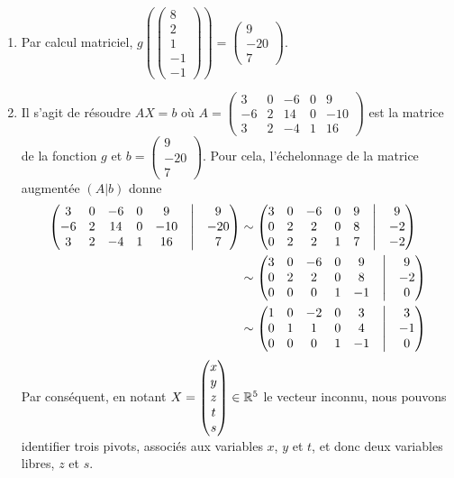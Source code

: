 {\begin{enumerate}
		\item
		Par calcul matriciel, $g(\begin{pmatrix} 8 \\ 2 \\ 1 \\ -1 \\ -1 \end{pmatrix}) = \begin{pmatrix} 9 \\ -20 \\ 7 \end{pmatrix}$.
		\item
		Il s'agit de résoudre $AX = b$ où $A = \begin{pmatrix}3&0&-6&0&9\\-6&2&14&0&-10\\3&2&-4&1&16\end{pmatrix}$ est la matrice de la fonction $g$ et $b =  \begin{pmatrix} 9 \\ -20 \\ 7 \end{pmatrix}$.
		Pour cela, l'échelonnage de la matrice augmentée $(A|b)$ donne
		\begin{align*}
			\begin{pmatrix}3&0&-6&0&9 & \bigm| & 9\\-6&2&14&0&-10 & \bigm| & -20\\3&2&-4&1&16 & \bigm| & 7\end{pmatrix} 
			&\sim
			\begin{pmatrix}3&0&-6&0&9 & \bigm| & 9\\0&2&2&0&8 & \bigm| & -2\\0&2&2&1&7& \bigm| & -2\end{pmatrix} 
			\\
			&\sim
			\begin{pmatrix}3&0&-6&0&9 & \bigm| & 9 \\ 0&2&2&0&8 & \bigm| & -2 \\ 0&0&0&1&-1& \bigm| & 0\end{pmatrix} 
			\\
			&\sim
			\begin{pmatrix}1&0&-2&0&3 & \bigm| & 3 \\ 0&1&1&0&4 & \bigm| & -1 \\ 0&0&0&1&-1& \bigm| & 0\end{pmatrix} 
		\end{align*}
		Par conséquent, en notant $X = \begin{pmatrix}x\\y\\z\\t\\s\end{pmatrix}\in\mathbb{R}^5$ le vecteur inconnu, nous pouvons identifier trois pivots, associés aux variables $x$, $y$ et $t$, et donc deux variables libres, $z$ et $s$.

\end{enumerate}}
